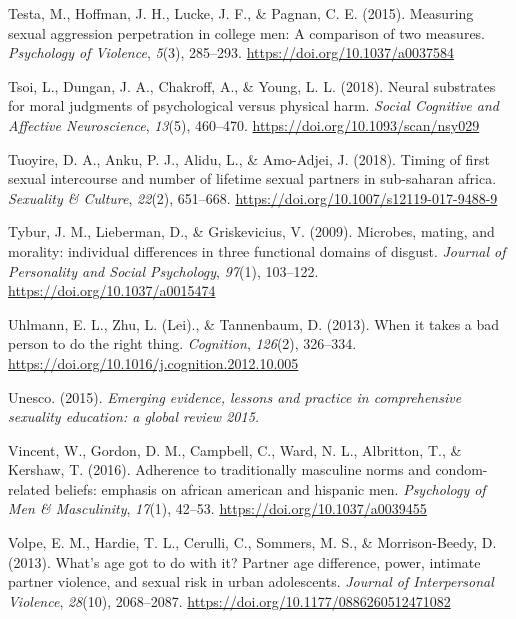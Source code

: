 \documentclass[
  english,
  donotrepeattitle,doc, 12pt, a4paper,floatsintext]{apa7}
\newlength{\cslhangindent}
\newlength{\cslentryspacingunit} %
\newenvironment{CSLReferences}[2] %
 {%
  \setlength{\parindent}{0pt}
  \ifodd #1
  \let\oldpar\par
  \def\par{\hangindent=\cslhangindent\oldpar}
  \fi
  \setlength{\parskip}{#2\cslentryspacingunit}
 }%
 {}
\begin{document}
\begin{CSLReferences}{1}{0}
\leavevmode{}%
Testa, M., Hoffman, J. H., Lucke, J. F., \& Pagnan, C. E. (2015). Measuring sexual aggression perpetration in college men: A comparison of two measures. \emph{Psychology of Violence}, \emph{5}(3), 285--293. \url{https://doi.org/10.1037/a0037584}

\leavevmode{}%
Tsoi, L., Dungan, J. A., Chakroff, A., \& Young, L. L. (2018). Neural substrates for moral judgments of psychological versus physical harm. \emph{Social Cognitive and Affective Neuroscience}, \emph{13}(5), 460--470. \url{https://doi.org/10.1093/scan/nsy029}

\leavevmode{}%
Tuoyire, D. A., Anku, P. J., Alidu, L., \& Amo-Adjei, J. (2018). Timing of first sexual intercourse and number of lifetime sexual partners in sub-saharan africa. \emph{Sexuality \& Culture}, \emph{22}(2), 651--668. \url{https://doi.org/10.1007/s12119-017-9488-9}

\leavevmode{}%
Tybur, J. M., Lieberman, D., \& Griskevicius, V. (2009). Microbes, mating, and morality: individual differences in three functional domains of disgust. \emph{Journal of Personality and Social Psychology}, \emph{97}(1), 103--122. \url{https://doi.org/10.1037/a0015474}

\leavevmode{}%
Uhlmann, E. L., Zhu, L. (Lei)., \& Tannenbaum, D. (2013). When it takes a bad person to do the right thing. \emph{Cognition}, \emph{126}(2), 326--334. \url{https://doi.org/10.1016/j.cognition.2012.10.005}

\leavevmode{}%
Unesco. (2015). \emph{Emerging evidence, lessons and practice in comprehensive sexuality education: a global review 2015.}

\leavevmode{}%
Vincent, W., Gordon, D. M., Campbell, C., Ward, N. L., Albritton, T., \& Kershaw, T. (2016). Adherence to traditionally masculine norms and condom-related beliefs: emphasis on african american and hispanic men. \emph{Psychology of Men \& Masculinity}, \emph{17}(1), 42--53. \url{https://doi.org/10.1037/a0039455}

\leavevmode{}%
Volpe, E. M., Hardie, T. L., Cerulli, C., Sommers, M. S., \& Morrison-Beedy, D. (2013). What's age got to do with it? Partner age difference, power, intimate partner violence, and sexual risk in urban adolescents. \emph{Journal of Interpersonal Violence}, \emph{28}(10), 2068--2087. \url{https://doi.org/10.1177/0886260512471082}


\end{CSLReferences}
\end{document}
